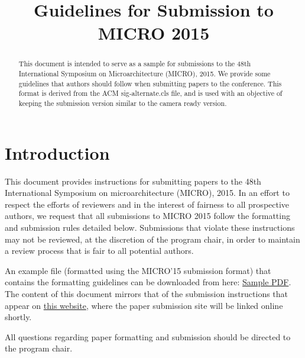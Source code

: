 \documentclass{sig-alternate}
\title{Guidelines for Submission to MICRO 2015}
\begin{document}
\maketitle
\thispagestyle{firstpage}
\pagestyle{plain}




\begin{abstract}

  This document is intended to serve as a sample for submissions to
  the 48th International Symposium on Microarchitecture (MICRO), 2015.
  We provide some guidelines that authors should follow when
  submitting papers to the conference.  This format is derived from
  the ACM sig-alternate.cls file, and is used with an objective of
  keeping the submission version similar to the camera ready version. 

\end{abstract}

\section{Introduction}

This document provides instructions for submitting papers to the 48th
International Symposium on microarchitecture (MICRO), 2015.  In an
effort to respect the efforts of reviewers and in the interest of
fairness to all prospective authors, we request that all submissions
to MICRO 2015 follow the formatting and submission rules detailed
below. Submissions that violate these instructions may not be reviewed,
at the discretion of the program chair, in order to maintain a review
process that is fair to all potential authors.


An example file (formatted using the MICRO'15 submission format) that
contains the formatting guidelines can be downloaded from here:
\href{http://www.microarch.org/micro48/samplepaper.pdf}{Sample
  PDF}.  The content of this document mirrors that of the submission
instructions that appear on
\href{http://www.microarch.org/micro48/submission.html}{this website},
where the paper submission site will be linked online shortly.

All questions regarding paper formatting and submission should be directed
to the program chair.
\end{document}
